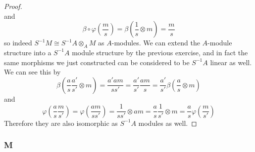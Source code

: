 \documentclass{article}
\begin{document}
\begin{proof}
\[    \]
    and
    \[
    \beta \circ \varphi(\frac{m}{s})=\beta(\frac{1}{s}\otimes m)=\frac{m}{s}
    \]
    so indeed $S^{-1}M\cong S^{-1}A\otimes_A M$ as $A$-modules. We can extend the $A$-module structure into a $S^{-1}A$ module structure by the previous exercise, and in fact the same morphisms we just constructed can be considered to be $S^{-1}A$ linear as well. We can see this by
    \[
    \beta(\frac{a}{s}\frac{a'}{s'}\otimes m)=\frac{a'am}{ss'}=\frac{a'}{s'}\frac{am}{s}=\frac{a'}{s'}\beta(\frac{a}{s}\otimes m)
    \]
    and
    \[
    \varphi(\frac{a}{s}\frac{m}{s'})=\varphi(\frac{am}{ss'})=\frac{1}{ss'}\otimes am=\frac{a}{s}\frac{1}{s'}\otimes m=\frac{a}{s}\varphi(\frac{m}{s'})
    \]
    Therefore they are also isomorphic as $S^{-1}A$ modules as well.
\end{proof}
\subsubsection{M}\label{1.3.M}
\end{document}

